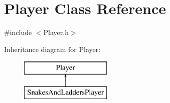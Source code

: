 \hypertarget{classPlayer}{\section{Player Class Reference}
\label{classPlayer}
}


{\ttfamily \#include $<$Player.\-h$>$}

Inheritance diagram for Player\-:\begin{figure}[H]
\begin{center}
\leavevmode
\includegraphics[height=2.000000cm]{classPlayer}
\end{center}
\end{figure}
